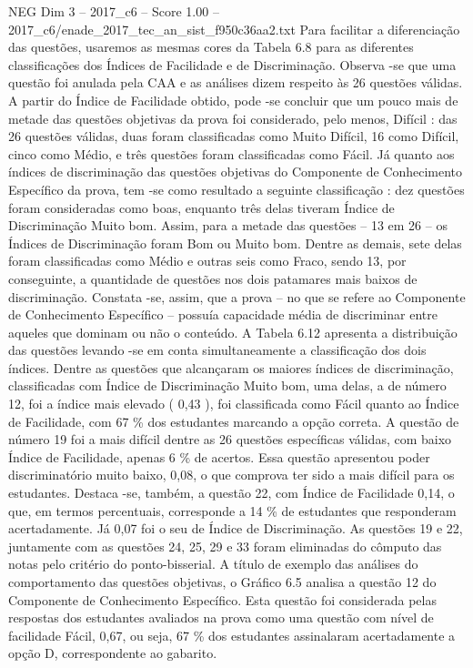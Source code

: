 \begin{textsample}{NEG Dim 3 – 2017\_c6 – Score 1.00 – 2017\_c6/enade\_2017\_tec\_an\_sist\_f950c36aa2.txt}
Para facilitar a diferenciação das questões, usaremos as mesmas cores da Tabela 6.8 para as diferentes classificações dos Índices de Facilidade e de Discriminação.
Observa -se que uma questão foi anulada pela CAA e as análises dizem respeito às 26 questões válidas.
A partir do Índice de Facilidade obtido, pode -se concluir que um pouco mais de metade das questões objetivas da prova foi considerado, pelo menos, Difícil : das 26 questões válidas, duas foram classificadas como Muito Difícil, 16 como Difícil, cinco como Médio, e três questões foram classificadas como Fácil.
Já quanto aos índices de discriminação das questões objetivas do Componente de Conhecimento Específico da prova, tem -se como resultado a seguinte classificação : dez questões foram consideradas como boas, enquanto três delas tiveram Índice de Discriminação Muito bom.
Assim, para a metade das questões – 13 em 26 – os Índices de Discriminação foram Bom ou Muito bom.
Dentre as demais, sete delas foram classificadas como Médio e outras seis como Fraco, sendo 13, por conseguinte, a quantidade de questões nos dois patamares mais baixos de discriminação.
Constata -se, assim, que a prova – no que se refere ao Componente de Conhecimento Específico – possuía capacidade média de discriminar entre aqueles que dominam ou não o conteúdo.
A Tabela 6.12 apresenta a distribuição das questões levando -se em conta simultaneamente a classificação dos dois índices.
Dentre as questões que alcançaram os maiores índices de discriminação, classificadas com Índice de Discriminação Muito bom, uma delas, a de número 12, foi a índice mais elevado ( 0,43 ), foi classificada como Fácil quanto ao Índice de Facilidade, com 67 \% dos estudantes marcando a opção correta.
A questão de número 19 foi a mais difícil dentre as 26 questões específicas válidas, com baixo Índice de Facilidade, apenas 6 \% de acertos.
Essa questão apresentou poder discriminatório muito baixo, 0,08, o que comprova ter sido a mais difícil para os estudantes.
Destaca -se, também, a questão 22, com Índice de Facilidade 0,14, o que, em termos percentuais, corresponde a 14 \% de estudantes que responderam acertadamente.
Já 0,07 foi o seu de Índice de Discriminação.
As questões 19 e 22, juntamente com as questões 24, 25, 29 e 33 foram eliminadas do cômputo das notas pelo critério do ponto-bisserial.
A título de exemplo das análises do comportamento das questões objetivas, o Gráfico 6.5 analisa a questão 12 do Componente de Conhecimento Específico.
Esta questão foi considerada pelas respostas dos estudantes avaliados na prova como uma questão com nível de facilidade Fácil, 0,67, ou seja, 67 \% dos estudantes assinalaram acertadamente a opção D, correspondente ao gabarito.

\end{textsample}
